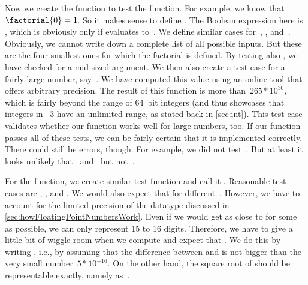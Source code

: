 Now we create the function  to test the  function.
For example, we know that $\factorial{0}=1$.
So it makes sense to define .
The Boolean expression here is , which is obviously only  if  evaluates to~.
We define similar cases for~, , and~.
Obviously, we cannot write down a complete list of all possible inputs.
But these are the four smallest ones for which the factorial is defined.
By testing also , we have checked  for a mid-sized argument.
We then also create a test case for a fairly large number, say~.
We have computed this value using an online tool that offers arbitrary precision.
The result of this function is more than~$265*10^{30}$, which is fairly beyond the range of 64~bit integers (and thus showcases that integers in \python~3 have an unlimited range, as stated back in \cref{sec:int}).
This test case validates whether our  function works well for large numbers, too.
If our  function passes all of these tests, we can be fairly certain that it is implemented correctly.
There could still be errors, though.
For example, we did not test~.
But at least it looks unlikely that~ and~  but not~.

For the  function, we create similar test function and call it .
Reasonable test cases are , , and .
We would also expect that  for different~.
However, we have to account for the limited precision of the datatype  discussed in \cref{sec:howFloatingPointNumbersWork}.
Even if we would get as close to  for some~ as possible, we can only represent 15 to 16 digits.
Therefore, we have to give a little bit of wiggle room when we compute  and expect that .
We do this by writing , i.e., by assuming that the difference between  and  is not bigger than the very small number~$5*10^{-16}$.
On the other hand, the square root of  should be representable exactly, namely as~.

